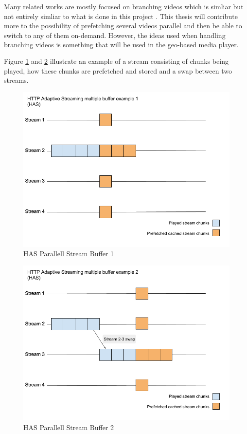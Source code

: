 Many related works are mostly focused on branching videos which is simliar but not entirely simliar to what is done in this project \cite{qualbranch, hasmultipath,scalableOnDemand}. This thesis will contribute more to the possibility of prefetching several videos parallel and then be able to switch to any of  them on-demand. However, the ideas used when handling branching videos is something that will be used in the geo-based media player.

Figure \ref{fig:HAS1} and \ref{fig:HAS2} illustrate an example of a stream consisting of chunks being played, how these chunks are prefetched and stored and a swap between two streams.

\begin{figure}[!ht]
\begin{center}
\includegraphics[scale=0.4]{HAS1.png}
\caption{HAS Parallell Stream Buffer 1}
\label{fig:HAS1}
\end{center}
\end{figure}

\begin{figure}[!ht]
\begin{center}
\includegraphics[scale=0.4]{HAS2.png}
\caption{HAS Parallell Stream Buffer 2}
\label{fig:HAS2}
\end{center}
\end{figure}

